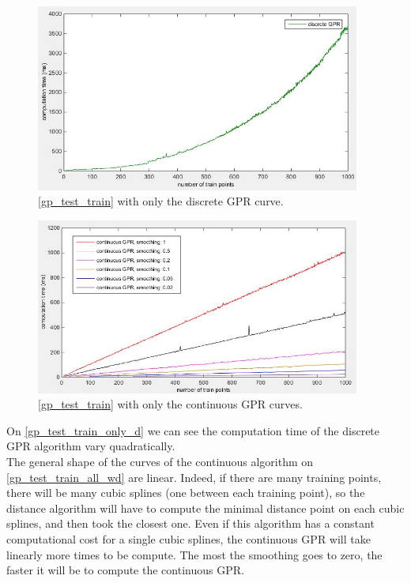 \begin{figure}[H]
\centering
\includegraphics[width=0.95\textwidth]{img/discrete_curve_training_analysis.jpg}
\caption{\autoref{gp_test_train} with only the discrete GPR curve.}
\label{gp_test_train_only_d}
\end{figure}

\begin{figure}[H]
\centering
\includegraphics[width=0.95\textwidth]{img/all_wd_curve_training_analysis.jpg}
\caption{\autoref{gp_test_train} with only the continuous GPR curves.}
\label{gp_test_train_all_wd}
\end{figure}


On \autoref{gp_test_train_only_d} we can see the computation time of the discrete GPR algorithm vary quadratically.\\
The general shape of the curves of the continuous algorithm on \autoref{gp_test_train_all_wd} are linear. Indeed, if there are many training points, there will be many cubic splines (one between each training point), so the distance algorithm will have to compute the minimal distance point on each cubic splines, and then took the closest one. Even if this algorithm has a constant computational cost for a single cubic splines, the continuous GPR will take linearly more times to be compute. The most the smoothing goes to zero, the faster it will be to compute the continuous GPR.\\

